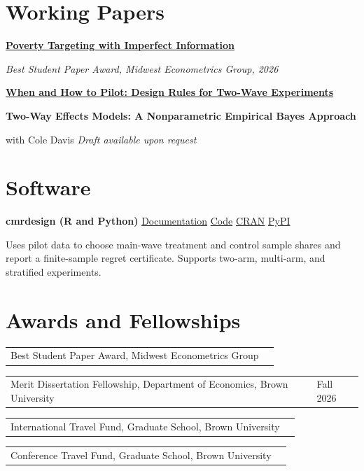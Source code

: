 \documentclass[11pt,letterpaper]{article}
\makeatletter
\newcommand{\cvlink}[2]{\href{#1}{#2}}
\newcommand{\datedline}[2]{%
  \noindent\begin{tabularx}{\textwidth}{@{}X>{\raggedleft\arraybackslash}p{1.48in}@{}}%
  #1 & #2
  \end{tabularx}\par
}
\newcommand{\papertitle}[2]{%
  \needspace{3\baselineskip}%
  \textbf{\cvlink{#1}{#2}}\par\vspace{0.13em}%
}
\newcommand{\paperend}{\par\vspace{0.45em}}
\makeatother
\begin{document}
\section{Working Papers}
\papertitle{https://juancyamin.github.io/files/poverty-targeting-with-imperfect-information.pdf}{Poverty Targeting with Imperfect Information}
\textit{Best Student Paper Award, Midwest Econometrics Group, 2026}\par
\paperend

\papertitle{https://juancyamin.github.io/files/when-and-how-to-pilot.pdf}{When and How to Pilot: Design Rules for Two-Wave Experiments}
\paperend

\textbf{Two-Way Effects Models: A Nonparametric Empirical Bayes Approach}\par
with Cole Davis \hfill \textit{Draft available upon request}\par\vspace{0.13em}
\paperend

\section{Software}
\textbf{cmrdesign (R and Python)}\hfill
\cvlink{https://juancyamin.github.io/cmrdesign/}{Documentation}
\;\textbar\;
\cvlink{https://github.com/juancyamin/cmrdesign}{Code}
\;\textbar\;
\cvlink{https://cran.r-project.org/package=cmrdesign}{CRAN}
\;\textbar\;
\cvlink{https://pypi.org/project/cmrdesign/}{PyPI}\par\vspace{0.13em}
Uses pilot data to choose main-wave treatment and control sample shares and
report a finite-sample regret certificate. Supports two-arm, multi-arm, and
stratified experiments.

\section{Awards and Fellowships}
\datedline{Best Student Paper Award, Midwest Econometrics Group}{2026}
\datedline{Merit Dissertation Fellowship, Department of Economics, Brown University}{Fall 2026}
\datedline{International Travel Fund, Graduate School, Brown University}{2025}
\datedline{Conference Travel Fund, Graduate School, Brown University}{2025}

\newpage
\end{document}
